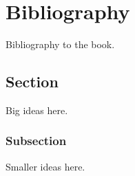 

\chapter{Bibliography}
\label{bibliography}

Bibliography to the book.
\section{Section}
Big ideas here.
\subsection{Subsection}
Smaller ideas here.




~                 
